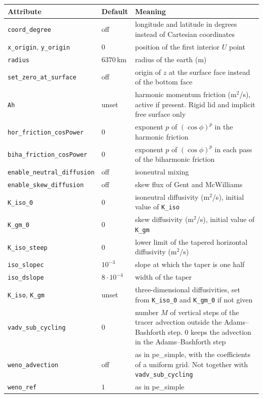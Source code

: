 \documentclass[12pt]{article}
\begin{document}
\begin{longtable}{@{}llp{7.6cm}@{}}
\hline
Attribute & Default & Meaning \\
\hline
\endhead
\verb|coord_degree| & off & longitude and latitude in degrees instead of Cartesian coordinates \\
\verb|x_origin|, \verb|y_origin| & $0$ & position of the first interior $U$ point \\
\verb|radius| & $6370\,$km & radius of the earth (m) \\
\verb|set_zero_at_surface| & off & origin of $z$ at the surface face instead of the bottom face \\
\verb|Ah| & unset & harmonic momentum friction (m$^2$/s), active if present.
  Rigid lid and implicit free surface only \\
\verb|hor_friction_cosPower| & $0$ & exponent $p$ of $(\cos \phi)^p$ in the harmonic friction \\
\verb|biha_friction_cosPower| & $0$ & exponent $p$ of $(\cos \phi)^p$ in each pass of the biharmonic friction \\
\verb|enable_neutral_diffusion| & off & isoneutral mixing \\
\verb|enable_skew_diffusion| & off & skew flux of Gent and McWilliams \\
\verb|K_iso_0| & $0$ & isoneutral diffusivity (m$^2$/s), initial value of \verb|K_iso| \\
\verb|K_gm_0| & $0$ & skew diffusivity (m$^2$/s), initial value of \verb|K_gm| \\
\verb|K_iso_steep| & $0$ & lower limit of the tapered horizontal diffusivity (m$^2$/s) \\
\verb|iso_slopec| & $10^{-3}$ & slope at which the taper is one half \\
\verb|iso_dslope| & $8 \cdot 10^{-4}$ & width of the taper \\
\verb|K_iso|, \verb|K_gm| & unset & three-dimensional diffusivities, set from \verb|K_iso_0| and \verb|K_gm_0| if not given \\
\verb|vadv_sub_cycling| & $0$ & number $M$ of vertical steps of the tracer advection outside the Adams--Bashforth step.
  $0$ keeps the advection in the Adams--Bashforth step \\
\verb|weno_advection| & off & as in pe\_simple, with the coefficients of a uniform grid.
  Not together with \verb|vadv_sub_cycling| \\
\verb|weno_ref| & $1$ & as in pe\_simple \\
\hline
\end{longtable}
\end{document}
